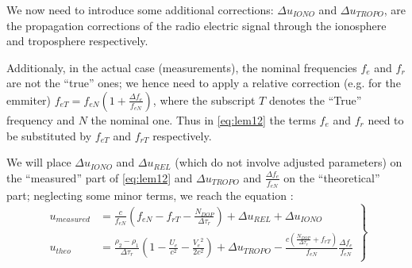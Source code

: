 We now need to introduce some additional corrections:
\(\Delta u_{IONO}\) and \(\Delta u_{TROPO}\), are the propagation corrections of 
the radio electric signal through the ionosphere and troposphere respectively. 

Additionaly, in the actual case (measurements), the nominal frequencies \(f_e\) and \(f_r\) 
are not the ``true'' ones; we hence need to apply a relative correction (e.g. for the 
emmiter) \(f_{eT} = f_{eN} (1 + \frac{\Delta f_e}{f_{eN}})\), where the subscript \(T\) 
denotes the ``True'' frequency and \(N\) the nominal one. Thus in \ref{eq:lem12} the 
terms \(f_e\) and \(f_r\) need to be substituted by \(f_{eT}\) and \(f_{rT}\) respectively.

We will place \(\Delta u_{IONO}\) and \(\Delta u_{REL}\) (which do not involve adjusted parameters) 
on the ``measured'' part of \ref{eq:lem12} and \(\Delta u_{TROPO}\) and \(\frac{\Delta f_e}{f_{eN}}\) 
on the ``theoretical'' part; neglecting some minor terms, we reach the equation \cite{lemoine-2016}:
\begin{equation}
    \label{eq:lem13}
    \left.\begin{aligned}
        u_{measured} & = \frac{c}{f_{eN}} (f_{eN} - f_{rT} -
         \frac{N_{DOP}}{\Delta\tau_r}) + \Delta u_{REL} + \Delta u_{IONO}\\
        u_{theo} &= \frac{\rho_2 - \rho_1}{\Delta\tau_r} (1- \frac{U_e}{c^2} - \frac{{V_e}^2}{2 c^2}) + \Delta u_{TROPO} - \frac{c(\frac{N_{DOP}}{\Delta\tau_r} + f_{rT})}{f_{eN}} \frac{\Delta f_e}{f_{eN}}
    \end{aligned}
\right\}
\end{equation}

